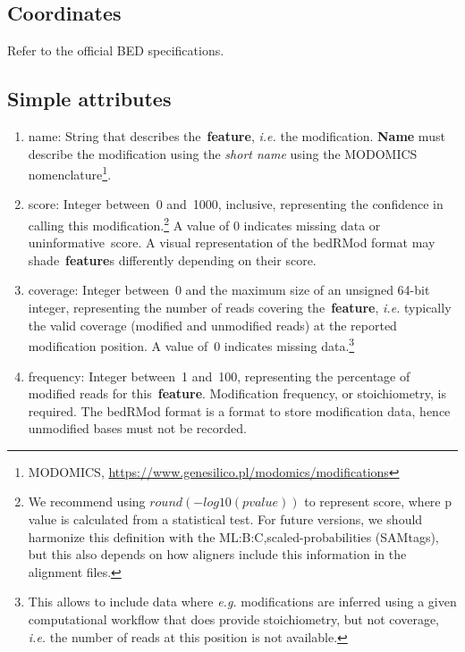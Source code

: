 \documentclass[11pt]{article}
\begin{document}
\subsection{Coordinates}
Refer to the official \ac{BED} specifications.

\subsection{Simple attributes}
\begin{enumerate}
\item \textsf{name}: String that describes the~\textbf{feature}, \textit{i.e.} the modification. \textbf{Name} must describe 
the modification using the \emph{short name} using the MODOMICS nomenclature\footnote{MODOMICS, \url{https://www.genesilico.pl/modomics/modifications}}.

\item \textsf{score}: Integer between~0 and~1000, inclusive, representing the confidence in calling this modification.\footnote{We recommend using $round(-log10(p value))$ to represent score, where p value is calculated from a statistical test. For future versions, we should harmonize this definition with 
the ML:B:C,scaled-probabilities (SAMtags), but this also depends on how aligners include this information in the alignment files.} A value of 0 indicates missing data or uninformative~\textsf{score}. A visual representation of the \ac{bedRMod} format may shade~\textbf{feature}s differently depending on their \textsf{score}.

\item \textsf{coverage}: Integer between~0 and the maximum size of an unsigned 64-bit integer, representing the number of reads covering the~\textbf{feature}, \textit{i.e.} typically the valid coverage (modified and unmodified reads) at the reported modification position. A value of~0 indicates missing data.\footnote{This allows to include data where \textit{e.g.} modifications are inferred using a given computational workflow that does provide stoichiometry, but not coverage, \textit{i.e.} the number of reads at this position is not available.}

\item \textsf{frequency}: Integer between~1 and~100, representing the percentage of modified reads for this~\textbf{feature}. Modification frequency, or stoichiometry, is required. The \ac{bedRMod} format is a format to store modification data, hence unmodified bases must not be recorded.  
\end{enumerate}
\end{document}
